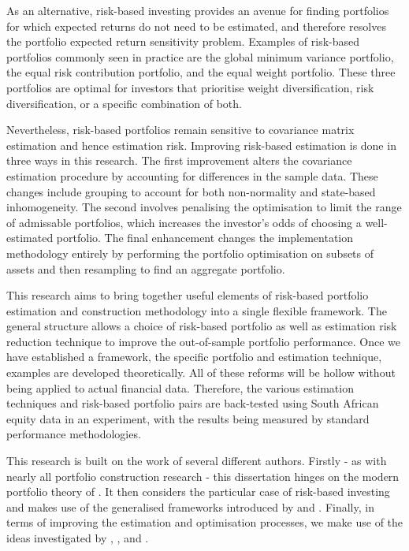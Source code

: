 \documentclass[
]{article}
\begin{document}
As an alternative, risk-based investing provides an avenue for finding portfolios for which expected
returns do not need to be estimated, and therefore resolves the portfolio expected return
sensitivity problem. Examples of risk-based portfolios commonly seen in practice are the global
minimum variance portfolio, the equal risk contribution portfolio, and the equal weight portfolio.
These three portfolios are optimal for investors that prioritise weight diversification, risk
diversification, or a specific combination of both.

Nevertheless, risk-based portfolios remain sensitive to covariance matrix estimation and hence
estimation risk. Improving risk-based estimation is done in three ways in this research. The first
improvement alters the covariance estimation procedure by accounting for differences in the sample
data. These changes include grouping to account for both non-normality and state-based
inhomogeneity. The second involves penalising the optimisation to limit the range of admissable
portfolios, which increases the investor's odds of choosing a well-estimated portfolio. The final
enhancement changes the implementation methodology entirely by performing the portfolio optimisation
on subsets of assets and then resampling to find an aggregate portfolio.

This research aims to bring together useful elements of risk-based portfolio estimation and
construction methodology into a single flexible framework. The general structure allows a choice of
risk-based portfolio as well as estimation risk reduction technique to improve the out-of-sample
portfolio performance. Once we have established a framework, the specific portfolio and estimation
technique, examples are developed theoretically. All of these reforms will be hollow without being
applied to actual financial data. Therefore, the various estimation techniques and risk-based
portfolio pairs are back-tested using South African equity data in an experiment, with the results
being measured by standard performance methodologies.

This research is built on the work of several different authors. Firstly - as with nearly all
portfolio construction research - this dissertation hinges on the modern portfolio theory of \citet{M52}.
It then considers the particular case of risk-based investing and makes use of the generalised
frameworks introduced by \citet{J13} and \citet{RR15}. Finally, in terms of improving the estimation and
optimisation processes, we make use of the ideas investigated by \citet{FD18}, \citet{K18}, and \citet{SW17}.
\end{document}
